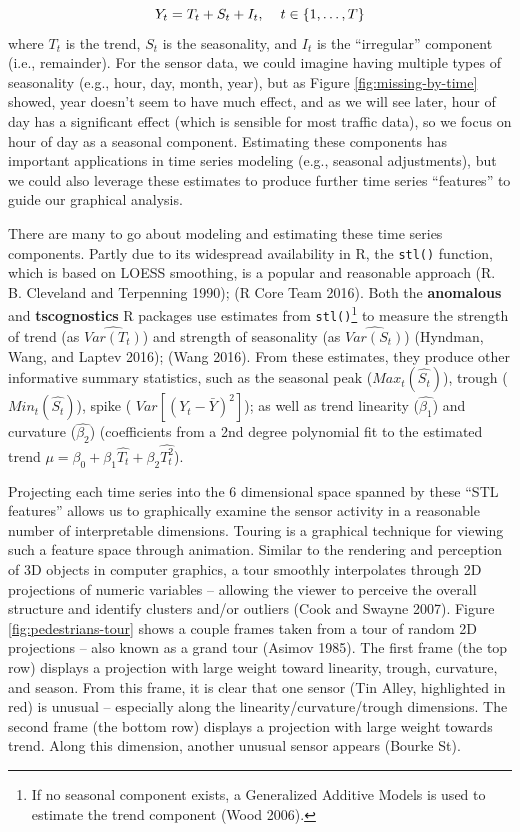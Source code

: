 \documentclass[12pt,]{article}
\let\rmarkdownfootnote\footnote%
\def\footnote{\protect\rmarkdownfootnote}
\theoremstyle{definition}
\theoremstyle{definition}
\theoremstyle{remark}
\begin{document}
\[Y_t = T_t + S_t + I_t, \hspace{0.4cm} t \in \{1, \dots, T \} \] where
\(T_t\) is the trend, \(S_t\) is the seasonality, and \(I_t\) is the
``irregular'' component (i.e., remainder). For the sensor data, we could
imagine having multiple types of seasonality (e.g., hour, day, month,
year), but as Figure \ref{fig:missing-by-time} showed, year doesn't seem
to have much effect, and as we will see later, hour of day has a
significant effect (which is sensible for most traffic data), so we
focus on hour of day as a seasonal component. Estimating these
components has important applications in time series modeling (e.g.,
seasonal adjustments), but we could also leverage these estimates to
produce further time series ``features'' to guide our graphical
analysis.

There are many to go about modeling and estimating these time series
components. Partly due to its widespread availability in R, the
\texttt{stl()} function, which is based on LOESS smoothing, is a popular
and reasonable approach (R. B. Cleveland and Terpenning 1990); (R Core
Team 2016). Both the \textbf{anomalous} and \textbf{tscognostics} R
packages use estimates from \texttt{stl()}\footnote{If no seasonal
  component exists, a Generalized Additive Models is used to estimate
  the trend component (Wood 2006).} to measure the strength of trend (as
\(\hat{Var(T_t)}\)) and strength of seasonality (as \(\hat{Var(S_t)}\))
(Hyndman, Wang, and Laptev 2016); (Wang 2016). From these estimates,
they produce other informative summary statistics, such as the seasonal
peak (\(Max_{t}(\hat{S_t})\)), trough (\(Min_{t}(\hat{S_t})\)), spike (
\(Var[(Y_t - \bar{Y})^2]\)); as well as trend linearity
(\(\hat{\beta_1}\)) and curvature (\(\hat{\beta_2}\)) (coefficients from
a 2nd degree polynomial fit to the estimated trend
\(\mu = \beta_0 + \beta_1\hat{T_t} + \beta_2\hat{T_t^2}\)).

Projecting each time series into the 6 dimensional space spanned by
these ``STL features'' allows us to graphically examine the sensor
activity in a reasonable number of interpretable dimensions. Touring is
a graphical technique for viewing such a feature space through
animation. Similar to the rendering and perception of 3D objects in
computer graphics, a tour smoothly interpolates through 2D projections
of numeric variables -- allowing the viewer to perceive the overall
structure and identify clusters and/or outliers (Cook and Swayne 2007).
Figure \ref{fig:pedestrians-tour} shows a couple frames taken from a
tour of random 2D projections -- also known as a grand tour (Asimov
1985). The first frame (the top row) displays a projection with large
weight toward linearity, trough, curvature, and season. From this frame,
it is clear that one sensor (Tin Alley, highlighted in red) is unusual
-- especially along the linearity/curvature/trough dimensions. The
second frame (the bottom row) displays a projection with large weight
towards trend. Along this dimension, another unusual sensor appears
(Bourke St).
\end{document}
